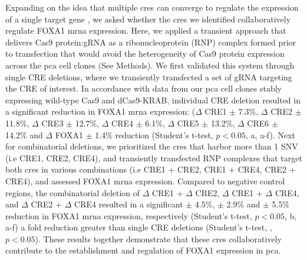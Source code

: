 Expanding on the idea that multiple \glspl{cre} can converge to regulate the expression of a single target gene \cite{sallariConvergenceDispersedRegulatory2016,baileyNoncodingSomaticInherited2016,pennacchioEnhancersFiveEssential2013}, we asked whether the \glspl{cre} we identified collaboratively regulate FOXA1 \gls{mrna} expression.
Here, we applied a transient approach that delivers Cas9 protein:gRNA as a ribonucleoprotein (RNP) complex formed prior to transfection that would avoid the heterogeneity of Cas9 protein expression across the \gls{pca} cell clones (See Methods).
We first validated this system through single CRE deletions, where we transiently transfected a set of gRNA targeting the CRE of interest.
In accordance with data from our \gls{pca} cell clones stably expressing wild-type Cas9 and dCas9-KRAB, individual CRE deletion resulted in a significant reduction in FOXA1 \gls{mrna} expression: ($\Delta$ CRE1  $\pm$ 7.3\%, $\Delta$ CRE2  $\pm$ 11.8\%, $\Delta$ CRE3  $\pm$ 12.7\%, $\Delta$ CRE4  $\pm$ 6.1\%, $\Delta$ CRE5  $\pm$ 13.2\%, $\Delta$ CRE6  $\pm$ 14.2\% and $\Delta$ FOXA1  $\pm$ 1.4\% reduction (Student's t-test, $p < 0.05$, a, a-f).
Next for combinatorial deletions, we prioritized the \glspl{cre} that harbor more than 1 SNV (i.e CRE1, CRE2, CRE4), and transiently transfected RNP complexes that target both \glspl{cre} in various combinations (i.e CRE1 + CRE2, CRE1 + CRE4, CRE2 + CRE4), and assessed FOXA1 \gls{mrna} expression.
Compared to negative control regions, the combinatorial deletion of $\Delta$ CRE1 + $\Delta$ CRE2, $\Delta$ CRE1 + $\Delta$ CRE4, and $\Delta$ CRE2 + $\Delta$ CRE4 resulted in a significant  $\pm$ 4.5\%,  $\pm$ 2.9\% and  $\pm$ 5.5\% reduction in FOXA1 \gls{mrna} expression, respectively (Student's t-test, $p<0.05$, b, a-f) a fold reduction greater than single CRE deletions (Student's t-test, , $p<0.05$).
These results together demonstrate that these \glspl{cre} collaboratively contribute to the establishment and regulation of FOXA1 expression in \gls{pca}.

